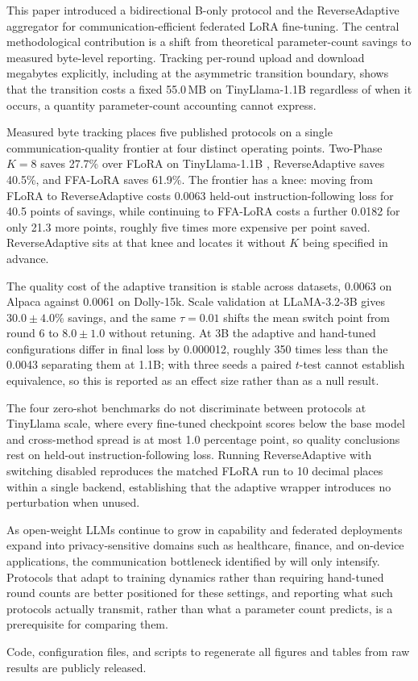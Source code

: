 This paper introduced a bidirectional B-only protocol and the ReverseAdaptive aggregator for communication-efficient federated LoRA fine-tuning. The central methodological contribution is a shift from theoretical parameter-count savings to measured byte-level reporting. Tracking per-round upload and download megabytes explicitly, including at the asymmetric transition boundary, shows that the transition costs a fixed 55.0\,MB on TinyLlama-1.1B regardless of when it occurs, a quantity parameter-count accounting cannot express.

Measured byte tracking places five published protocols on a single communication-quality frontier at four distinct operating points. Two-Phase $K{=}8$ saves 27.7\% over FLoRA \citep{wang2024flora} on TinyLlama-1.1B \citep{zhang2024tinyllama}, ReverseAdaptive saves 40.5\%, and FFA-LoRA \citep{sun2024ffalora} saves 61.9\%. The frontier has a knee: moving from FLoRA to ReverseAdaptive costs 0.0063 held-out instruction-following loss for 40.5 points of savings, while continuing to FFA-LoRA costs a further 0.0182 for only 21.3 more points, roughly five times more expensive per point saved. ReverseAdaptive sits at that knee and locates it without $K$ being specified in advance.

The quality cost of the adaptive transition is stable across datasets, 0.0063 on Alpaca against 0.0061 on Dolly-15k. Scale validation at LLaMA-3.2-3B \citep{dubey2024llama3} gives $30.0 \pm 4.0$\% savings, and the same $\tau{=}0.01$ shifts the mean switch point from round 6 to $8.0 \pm 1.0$ without retuning. At 3B the adaptive and hand-tuned configurations differ in final loss by 0.000012, roughly 350 times less than the 0.0043 separating them at 1.1B; with three seeds a paired $t$-test cannot establish equivalence, so this is reported as an effect size rather than as a null result.

The four zero-shot benchmarks do not discriminate between protocols at TinyLlama scale, where every fine-tuned checkpoint scores below the base model and cross-method spread is at most 1.0 percentage point, so quality conclusions rest on held-out instruction-following loss. Running ReverseAdaptive with switching disabled reproduces the matched FLoRA run to 10 decimal places within a single backend, establishing that the adaptive wrapper introduces no perturbation when unused.

As open-weight LLMs \citep{dubey2024llama3,zhang2024tinyllama} continue to grow in capability and federated deployments expand into privacy-sensitive domains such as healthcare, finance, and on-device applications, the communication bottleneck identified by \citet{kairouz2021advances} will only intensify. Protocols that adapt to training dynamics rather than requiring hand-tuned round counts are better positioned for these settings, and reporting what such protocols actually transmit, rather than what a parameter count predicts, is a prerequisite for comparing them.

Code, configuration files, and scripts to regenerate all figures and tables from raw results are publicly released.
